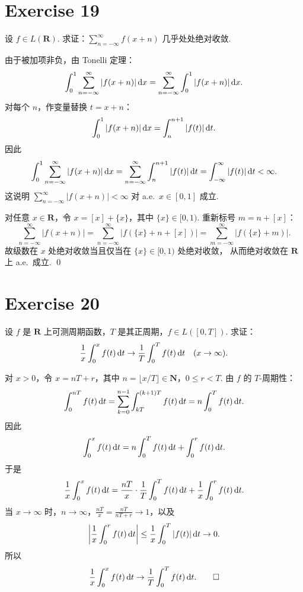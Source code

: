 \documentclass{article}
\begin{document}
\section{Exercise 19}

设 $f \in L(\mathbf{R})$. 求证：$\displaystyle\sum_{n=-\infty}^{\infty} f(x+n)$ 几乎处处绝对收敛.

\begin{solution}
  由于被加项非负，由 Tonelli 定理：
  \[
    \int_0^1 \sum_{n=-\infty}^{\infty} |f(x+n)|\,\mathrm{d} x
    = \sum_{n=-\infty}^{\infty} \int_0^1 |f(x+n)|\,\mathrm{d} x.
  \]
  对每个 $n$，作变量替换 $t = x + n$：
  \[
    \int_0^1 |f(x+n)|\,\mathrm{d} x = \int_n^{n+1} |f(t)|\,\mathrm{d} t.
  \]
  因此
  \[
    \int_0^1 \sum_{n=-\infty}^{\infty} |f(x+n)|\,\mathrm{d} x
    = \sum_{n=-\infty}^{\infty} \int_n^{n+1} |f(t)|\,\mathrm{d} t
    = \int_{-\infty}^{\infty} |f(t)|\,\mathrm{d} t < \infty.
  \]
  这说明 $\sum_{n=-\infty}^{\infty} |f(x+n)| < \infty$ 对 a.e.\ $x \in [0,1]$ 成立.

  对任意 $x \in \mathbf{R}$，令 $x = [x] + \{x\}$，其中 $\{x\} \in [0,1)$.
  重新标号 $m = n + [x]$：
  \[
    \sum_{n=-\infty}^{\infty} |f(x+n)|
    = \sum_{n=-\infty}^{\infty} |f(\{x\} + n + [x])|
    = \sum_{m=-\infty}^{\infty} |f(\{x\} + m)|.
  \]
  故级数在 $x$ 处绝对收敛当且仅当在 $\{x\} \in [0,1)$ 处绝对收敛，
  从而绝对收敛在 $\mathbf{R}$ 上 a.e.\ 成立. \qed
\end{solution}

\section{Exercise 20}

设 $f$ 是 $\mathbf{R}$ 上可测周期函数，$T$ 是其正周期，$f \in L([0, T])$. 求证：
\[
  \frac{1}{x} \int_0^x f(t)\,\mathrm{d} t \to \frac{1}{T} \int_0^T f(t)\,\mathrm{d} t \quad (x \to \infty).
\]

\begin{solution}
  对 $x > 0$，令 $x = nT + r$，其中 $n = \lfloor x/T \rfloor \in \mathbf{N}$，$0 \le r < T$.
  由 $f$ 的 $T$-周期性：
  \[
    \int_0^{nT} f(t)\,\mathrm{d} t
    = \sum_{k=0}^{n-1} \int_{kT}^{(k+1)T} f(t)\,\mathrm{d} t
    = n \int_0^T f(t)\,\mathrm{d} t.
  \]
  因此
  \[
    \int_0^x f(t)\,\mathrm{d} t
    = n \int_0^T f(t)\,\mathrm{d} t + \int_0^r f(t)\,\mathrm{d} t.
  \]
  于是
  \[
    \frac{1}{x} \int_0^x f(t)\,\mathrm{d} t
    = \frac{nT}{x} \cdot \frac{1}{T}\int_0^T f(t)\,\mathrm{d} t
    + \frac{1}{x}\int_0^r f(t)\,\mathrm{d} t.
  \]
  当 $x \to \infty$ 时，$n \to \infty$，$\frac{nT}{x} = \frac{nT}{nT+r} \to 1$，以及
  \[
    \left|\frac{1}{x}\int_0^r f(t)\,\mathrm{d} t\right|
    \le \frac{1}{x}\int_0^T |f(t)|\,\mathrm{d} t \to 0.
  \]
  所以
  \[
    \frac{1}{x}\int_0^x f(t)\,\mathrm{d} t \to \frac{1}{T}\int_0^T f(t)\,\mathrm{d} t. \qed
  \]
\end{solution}
\end{document}
